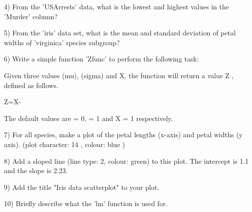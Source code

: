4) From the 'USArrests' data, what is the lowest and highest values in the 'Murder' column?

 

5) From the 'iris' data set, what is the mean and standard deviation of petal widths of 'virginica' species subgroup?

 

6) Write a simple function 'Zfunc' to perform the following task:

 

Given three values  (mu),  (sigma) and X, the function will return a value Z , defined as follows.

 

Z=X-

 

The default values are = 0,  = 1 and X = 1 respectively.

 

7) For all species, make a plot of the petal lengths (x-axis) and petal widths (y axis). (plot character: 14 , colour: blue ) 

 

8) Add a sloped line (line type: 2, colour: green) to this plot. The intercept is  1.1 and the slope is 2.23.

 

9) Add the title "Iris data scatterplot" to your plot. 

 

10) Briefly describe what the 'lm' function is used for.

 

 

